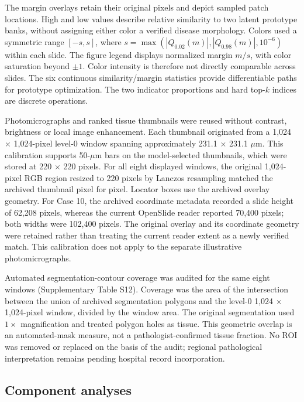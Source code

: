 The margin overlays retain their original pixels and depict sampled patch locations. High and low values describe relative similarity to two latent prototype banks, without assigning either color a verified disease morphology. Colors used a symmetric range $[-s,s]$, where $s=\max(|Q_{0.02}(m)|,|Q_{0.98}(m)|,10^{-6})$ within each slide. The figure legend displays normalized margin $m/s$, with color saturation beyond $\pm1$. Color intensity is therefore not directly comparable across slides. The six continuous similarity/margin statistics provide differentiable paths for prototype optimization. The two indicator proportions and hard top-$k$ indices are discrete operations.

Photomicrographs and ranked tissue thumbnails were reused without contrast, brightness or local image enhancement. Each thumbnail originated from a 1,024 $\times$ 1,024-pixel level-0 window spanning approximately 231.1 $\times$ 231.1 $\mu\mathrm{m}$. This calibration supports 50-$\mu\mathrm{m}$ bars on the model-selected thumbnails, which were stored at 220 $\times$ 220 pixels. For all eight displayed windows, the original 1,024-pixel RGB region resized to 220 pixels by Lanczos resampling matched the archived thumbnail pixel for pixel. Locator boxes use the archived overlay geometry. For Case 10, the archived coordinate metadata recorded a slide height of 62,208 pixels, whereas the current OpenSlide reader reported 70,400 pixels; both widths were 102,400 pixels. The original overlay and its coordinate geometry were retained rather than treating the current reader extent as a newly verified match. This calibration does not apply to the separate illustrative photomicrographs. 

Automated segmentation-contour coverage was audited for the same eight windows (Supplementary Table S12). Coverage was the area of the intersection between the union of archived segmentation polygons and the level-0 1,024 $\times$ 1,024-pixel window, divided by the window area. The original segmentation used $1\times$ magnification and treated polygon holes as tissue. This geometric overlap is an automated-mask measure, not a pathologist-confirmed tissue fraction. No ROI was removed or replaced on the basis of the audit; regional pathological interpretation remains pending hospital record incorporation.


\subsection{Component analyses}

